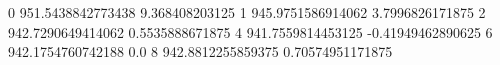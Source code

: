 0 951.5438842773438 9.368408203125
1 945.9751586914062 3.7996826171875
2 942.7290649414062 0.5535888671875
4 941.7559814453125 -0.41949462890625
6 942.1754760742188 0.0
8 942.8812255859375 0.70574951171875
